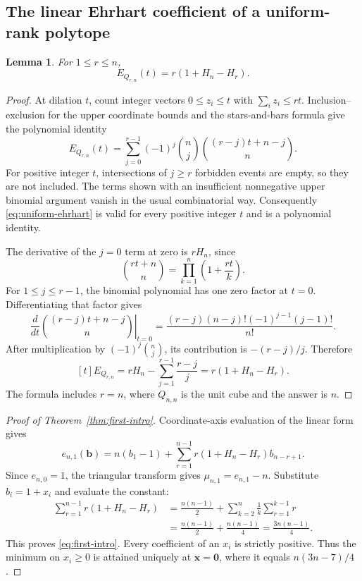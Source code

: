 \documentclass[11pt]{article}
\newtheorem{lemma}[theorem]{Lemma}
\theoremstyle{definition}
\newcommand{\bb}{\mathbf b}
\newcommand{\xx}{\mathbf x}
\newcommand{\zero}{\mathbf 0}
\numberwithin{equation}{section}
\begin{document}
\subsection{The linear Ehrhart coefficient of a uniform-rank polytope}
\begin{lemma}
\label{lem:uniform-linear}
For $1\le r\le n$,
\begin{equation}
 [t]E_{Q_{r,n}}(t)=r(1+H_n-H_r).
 \label{eq:uniform-linear}
\end{equation}
\end{lemma}
\begin{proof}
At dilation $t$, count integer vectors $0\le z_i\le t$ with
$\sum_i z_i\le rt$. Inclusion--exclusion for the upper coordinate bounds
and the stars-and-bars formula give the polynomial identity
\begin{equation}
 E_{Q_{r,n}}(t)=\sum_{j=0}^{r-1}(-1)^j\binom nj
                     \binom{(r-j)t+n-j}{n}.
 \label{eq:uniform-ehrhart}
\end{equation}
For positive integer $t$, intersections of $j\ge r$ forbidden events
are empty, so they are not included. The terms shown with an insufficient
nonnegative upper binomial argument vanish in the usual combinatorial way.
Consequently \eqref{eq:uniform-ehrhart} is valid for every positive integer
$t$ and is a polynomial identity.

The derivative of the $j=0$ term at zero is $rH_n$, since
\[
 \binom{rt+n}{n}=\prod_{k=1}^n\left(1+\frac{rt}{k}\right).
\]
For $1\le j\le r-1$, the binomial polynomial has one zero factor at
$t=0$. Differentiating that factor gives
\[
 \left.\frac{d}{dt}\binom{(r-j)t+n-j}{n}\right|_{t=0}
 =\frac{(r-j)(n-j)!(-1)^{j-1}(j-1)!}{n!}.
\]
After multiplication by $(-1)^j\binom nj$, its contribution is
$-(r-j)/j$. Therefore
\[
 [t]E_{Q_{r,n}}=rH_n-\sum_{j=1}^{r-1}\frac{r-j}{j}
             =r(1+H_n-H_r).
\]
The formula includes $r=n$, where $Q_{n,n}$ is the unit cube and the
answer is $n$.
\end{proof}

\begin{proof}[Proof of Theorem~\ref{thm:first-intro}]
Coordinate-axis evaluation of the linear form gives
\begin{equation}
 e_{n,1}(\bb)=n(b_1-1)+
   \sum_{r=1}^{n-1}r(1+H_n-H_r)b_{n-r+1}.
 \label{eq:linear-ehrhart}
\end{equation}
Since $e_{n,0}=1$, the triangular transform gives
$\mu_{n,1}=e_{n,1}-n$. Substitute $b_i=1+x_i$ and evaluate the constant:
\begin{align*}
 \sum_{r=1}^{n-1}r(1+H_n-H_r)
 &=\frac{n(n-1)}2+
   \sum_{k=2}^n\frac1k\sum_{r=1}^{k-1}r\\
 &=\frac{n(n-1)}2+\frac{n(n-1)}4
 =\frac{3n(n-1)}4.
\end{align*}
This proves \eqref{eq:first-intro}. Every coefficient of an $x_i$ is
strictly positive. Thus the minimum on $x_i\ge0$ is attained uniquely at
$\xx=\zero$, where it equals $n(3n-7)/4$.
\end{proof}
\end{document}
